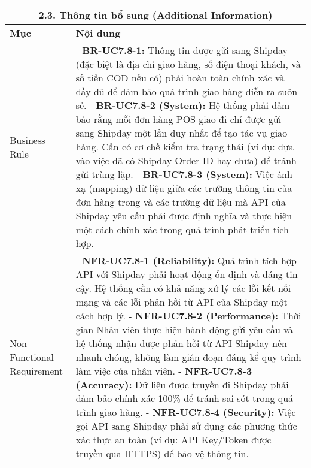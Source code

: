 \begin{longtable}{|m{4cm}|p{11cm}|}
\hline
\multicolumn{2}{|c|}{\textbf{2.3. Thông tin bổ sung (Additional Information)}} \\
\hline
\textbf{Mục} & \textbf{Nội dung} \\
\hline
Business Rule & - \textbf{BR-UC7.8-1:} Thông tin được gửi sang Shipday (đặc biệt là địa chỉ giao hàng, số điện thoại khách, và số tiền COD nếu có) phải hoàn toàn chính xác và đầy đủ để đảm bảo quá trình giao hàng diễn ra suôn sẻ. \newline - \textbf{BR-UC7.8-2 (System):} Hệ thống phải đảm bảo rằng mỗi đơn hàng POS giao đi chỉ được gửi sang Shipday một lần duy nhất để tạo tác vụ giao hàng. Cần có cơ chế kiểm tra trạng thái (ví dụ: dựa vào việc đã có Shipday Order ID hay chưa) để tránh gửi trùng lặp. \newline - \textbf{BR-UC7.8-3 (System):} Việc ánh xạ (mapping) dữ liệu giữa các trường thông tin của đơn hàng trong và các trường dữ liệu mà API của Shipday yêu cầu phải được định nghĩa và thực hiện một cách chính xác trong quá trình phát triển tích hợp. \\
\hline
Non-Functional Requirement & - \textbf{NFR-UC7.8-1 (Reliability):} Quá trình tích hợp API với Shipday phải hoạt động ổn định và đáng tin cậy. Hệ thống cần có khả năng xử lý các lỗi kết nối mạng và các lỗi phản hồi từ API của Shipday một cách hợp lý. \newline - \textbf{NFR-UC7.8-2 (Performance):} Thời gian Nhân viên thực hiện hành động gửi yêu cầu và hệ thống nhận được phản hồi từ API Shipday nên nhanh chóng, không làm gián đoạn đáng kể quy trình làm việc của nhân viên. \newline - \textbf{NFR-UC7.8-3 (Accuracy):} Dữ liệu được truyền đi Shipday phải đảm bảo chính xác 100\% để tránh sai sót trong quá trình giao hàng. \newline - \textbf{NFR-UC7.8-4 (Security):} Việc gọi API sang Shipday phải sử dụng các phương thức xác thực an toàn (ví dụ: API Key/Token được truyền qua HTTPS) để bảo vệ thông tin. \\
\hline
\end{longtable}

